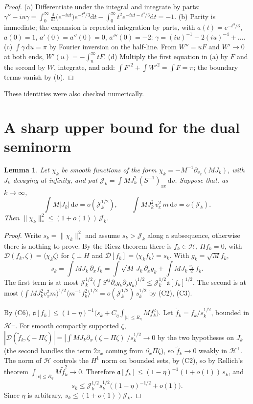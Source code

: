 \documentclass[11pt]{article}
\newcommand{\dd}{\mathrm{d}}
\newcommand{\cD}{\mathcal{D}}
\newcommand{\cH}{\mathcal{H}}
\newcommand{\cJ}{\mathcal{J}}
\newcommand{\fa}{\mathfrak{a}}
\newcommand{\avg}[1]{\langle #1\rangle}
\newcommand{\nstar}[1]{\|#1\|_*}
\newtheorem{lemma}[theorem]{Lemma}
\theoremstyle{remark}
\begin{document}
\begin{proof}
(a) Differentiate under the integral and integrate by parts:
$\gamma''-iu\gamma=\int_0^\infty\frac{\dd}{\dd t}\bigl(e^{-iut}\bigr)
e^{-t^3/3}\dd t-\int_0^\infty t^2e^{-iut-t^3/3}\dd t=-1$. (b) Parity is
immediate; the expansion is repeated integration by parts, with
$a(t)=e^{-t^3/3}$, $a(0)=1$, $a'(0)=a''(0)=0$, $a'''(0)=-2$:
$\gamma=(iu)^{-1}-2(iu)^{-4}+\dots$. (c) $\int\gamma\,\dd u=\pi$ by Fourier
inversion on the half-line. From $W''=uF$ and $W'\to0$ at both ends,
$W'(u)=-\int_u^\infty tF$. (d) Multiply the first equation in (a) by $F$ and
the second by $W$, integrate, and add: $\int F'^2+\int W'^2=\int F=\pi$; the
boundary terms vanish by (b).
\end{proof}

These identities were also checked numerically.

\section{A sharp upper bound for the dual seminorm}

\begin{lemma}\label{lem:flux}
Let $\chi_k$ be smooth functions of the form
$\chi_k=-M^{-1}\partial_{v_x}(MJ_k)$, with $J_k$ decaying at infinity, and
put $\cJ_k=\int MJ_k^2\,(S^{-1})_{xx}\,\dd v$. Suppose that, as $k\to\infty$,
\[
  \int M|J_k|\,\dd v=o(\cJ_k^{1/2}),\qquad
  \int MJ_k^2\,v_x^2\,m\,\dd v=o(\cJ_k).
\]
Then $\nstar{\chi_k}^2\le(1+o(1))\,\cJ_k$.
\end{lemma}

\begin{proof}
Write $s_k=\nstar{\chi_k}^2$ and assume $s_k>\cJ_k$ along a subsequence,
otherwise there is nothing to prove. By the Riesz theorem there is
$f_k\in\cH$, $\Pi f_k=0$, with $\cD(f_k,\zeta)=\avg{\chi_k\zeta}$ for
$\zeta\perp H$ and $\cD[f_k]=\avg{\chi_kf_k}=s_k$. With $g_k=\sqrt M f_k$,
\[
  s_k=\int MJ_k\,\partial_xf_k
     =\int\sqrt M\,J_k\,\partial_xg_k+\int MJ_k\,\tfrac{v_x}{2}\,f_k .
\]
The first term is at most
$\cJ_k^{1/2}\bigl(\int S^{ij}\partial_ig_k\partial_jg_k\bigr)^{1/2}
\le\cJ_k^{1/2}\fa[f_k]^{1/2}$. The second is at most
$\bigl(\int MJ_k^2v_x^2m\bigr)^{1/2}\avg{m^{-1}f_k^2}^{1/2}
=o(\cJ_k^{1/2})\,s_k^{1/2}$ by (C2), (C3).

By (C6), $\fa[f_k]\le(1-\eta)^{-1}\bigl(s_k+C_\eta\int_{|v|\le R_\eta}Mf_k^2\bigr)$.
Let $\tilde f_k=f_k/s_k^{1/2}$, bounded in $\cH^\perp$. For smooth compactly
supported $\zeta$,
$|\cD(\tilde f_k,\zeta-\Pi\zeta)|=|\int MJ_k\partial_x(\zeta-\Pi\zeta)|/s_k^{1/2}\to0$
by the two hypotheses on $J_k$ (the second handles the term $2v_x$ coming
from $\partial_x\Pi\zeta$), so $\tilde f_k\to0$ weakly in
$\cH^\perp$. The norm of $\cH$ controls the $H^1$ norm on bounded sets, by
(C2), so by Rellich's theorem $\int_{|v|\le R_\eta}M\tilde f_k^2\to0$.
Therefore $\fa[f_k]\le(1-\eta)^{-1}(1+o(1))\,s_k$, and
\[
  s_k\le\cJ_k^{1/2}s_k^{1/2}\bigl((1-\eta)^{-1/2}+o(1)\bigr).
\]
Since $\eta$ is arbitrary, $s_k\le(1+o(1))\cJ_k$.
\end{proof}
\end{document}
